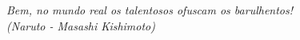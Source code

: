 \begin{epigrafe} 
\vspace*{\fill} 
\begin{flushright} 
\textit{Bem, no mundo real os talentosos ofuscam os barulhentos!\\(Naruto - Masashi Kishimoto)} 
\end{flushright} 
\end{epigrafe} 
\newpage